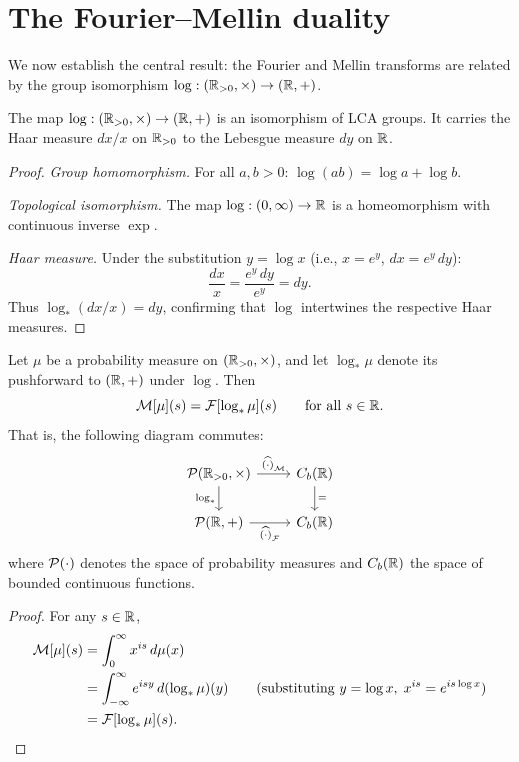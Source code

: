 \section{The Fourier--Mellin duality}

We now establish the central result: the Fourier and Mellin transforms are related by the group isomorphism $\log : (\mathbb{R}_{>0}, \times) \to (\mathbb{R}, +)$.

\begin{proposition}\label{prop:log-iso}
The map $\log : (\mathbb{R}_{>0}, \times) \to (\mathbb{R}, +)$ is an isomorphism of LCA groups. It carries the Haar measure $dx/x$ on $\mathbb{R}_{>0}$ to the Lebesgue measure $dy$ on $\mathbb{R}$.
\end{proposition}

\begin{proof}
\emph{Group homomorphism.} For all $a, b > 0$: $\log(ab) = \log a + \log b$.

\emph{Topological isomorphism.} The map $\log : (0, \infty) \to \mathbb{R}$ is a homeomorphism with continuous inverse $\exp$.

\emph{Haar measure.} Under the substitution $y = \log x$ (i.e., $x = e^y$, $dx = e^y\, dy$):
\[
\frac{dx}{x} = \frac{e^y\, dy}{e^y} = dy.
\]
Thus $\log_*(dx/x) = dy$, confirming that $\log$ intertwines the respective Haar measures.
\end{proof}

\begin{theorem}\label{thm:mellin-fourier}
Let $\mu$ be a probability measure on $(\mathbb{R}_{>0}, \times)$, and let $\log_*\mu$ denote its pushforward to $(\mathbb{R}, +)$ under $\log$. Then
\begin{equation}\label{eq:mellin-fourier}
\mathcal{M}[\mu](s) = \mathcal{F}[\log_*\mu](s) \qquad \text{for all } s \in \mathbb{R}.
\end{equation}
That is, the following diagram commutes:
\begin{equation}\label{eq:cd-measures}
\begin{tikzcd}
\cP(\Rpos, \times) \arrow[r, "\widehat{(\cdot)}_{\cM}"] \arrow[d, "\log_*"'] & C_b(\R) \arrow[d, "="] \\
\cP(\R, +) \arrow[r, "\widehat{(\cdot)}_{\cF}"'] & C_b(\R)
\end{tikzcd}
\end{equation}
where $\mathcal{P}(\cdot)$ denotes the space of probability measures and $C_b(\mathbb{R})$ the space of bounded continuous functions.
\end{theorem}

\begin{proof}
For any $s \in \mathbb{R}$,
\begin{align*}
\mathcal{M}[\mu](s) &= \int_0^\infty x^{is}\, d\mu(x) \\
&= \int_{-\infty}^{\infty} e^{isy}\, d(\log_*\mu)(y) \qquad \text{(substituting } y = \log x,\; x^{is} = e^{is\log x}\text{)} \\
&= \mathcal{F}[\log_*\mu](s). \qedhere
\end{align*}
\end{proof}

